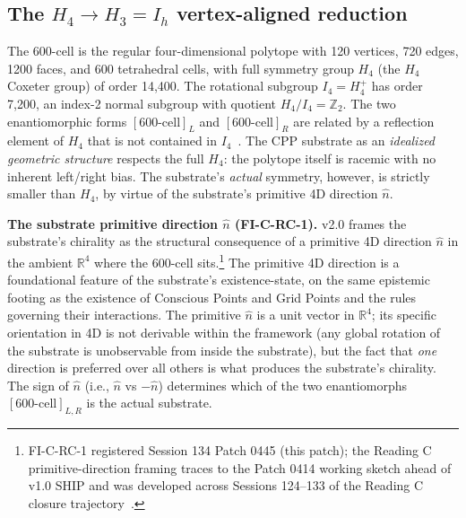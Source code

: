 \documentclass[11pt,letterpaper]{article}
\newcommand{\Hfour}{H_4}
\newcommand{\Ifour}{I_4}
\begin{document}
\subsection{The $\Hfour \to H_3 = I_h$ vertex-aligned reduction}\label{sec:h4_i4}

The 600-cell is the regular four-dimensional polytope with 120 vertices, 720 edges, 1200 faces, and 600 tetrahedral cells, with full symmetry group $\Hfour$ (the $H_4$ Coxeter group) of order 14{,}400. The rotational subgroup $\Ifour = H_4^+$ has order 7{,}200, an index-2 normal subgroup with quotient $\Hfour / \Ifour = \mathbb{Z}_2$. The two enantiomorphic forms $[\text{600-cell}]_L$ and $[\text{600-cell}]_R$ are related by a reflection element of $\Hfour$ that is not contained in $\Ifour$~\cite{coxeter_1973}. The CPP substrate as an \emph{idealized geometric structure} respects the full $\Hfour$: the polytope itself is racemic with no inherent left/right bias. The substrate's \emph{actual} symmetry, however, is strictly smaller than $\Hfour$, by virtue of the substrate's primitive 4D direction $\hat{n}$.

\textbf{The substrate primitive direction $\hat{n}$ (FI-C-RC-1).} v2.0 frames the substrate's chirality as the structural consequence of a primitive 4D direction $\hat{n}$ in the ambient $\mathbb{R}^4$ where the 600-cell sits.\footnote{FI-C-RC-1 registered Session 134 Patch 0445 (this patch); the Reading C primitive-direction framing traces to the Patch 0414 working sketch ahead of v1.0 SHIP and was developed across Sessions 124--133 of the Reading C closure trajectory~\cite{abshier_capotauro_chiral_mechanism_sketch}.} The primitive 4D direction is a foundational feature of the substrate's existence-state, on the same epistemic footing as the existence of Conscious Points and Grid Points and the rules governing their interactions. The primitive $\hat{n}$ is a unit vector in $\mathbb{R}^4$; its specific orientation in 4D is not derivable within the framework (any global rotation of the substrate is unobservable from inside the substrate), but the fact that \emph{one} direction is preferred over all others is what produces the substrate's chirality. The sign of $\hat{n}$ (i.e., $\hat{n}$ vs $-\hat{n}$) determines which of the two enantiomorphs $[\text{600-cell}]_{L,R}$ is the actual substrate.
\end{document}
